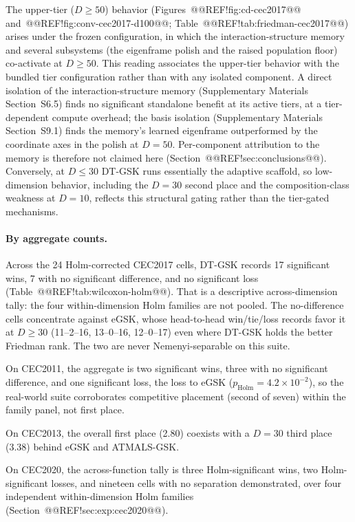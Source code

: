 \documentclass[10pt,a4paper]{article}
\newcommand{\dtgsk}{DT-GSK}
\newcommand{\atmals}{ATMALS-GSK}
\newcommand{\egsk}{eGSK}
\begin{document}
The upper-tier ($D \geq 50$) behavior (Figures~@@REF!fig:cd-cec2017@@
and~@@REF!fig:conv-cec2017-d100@@; Table~@@REF!tab:friedman-cec2017@@) arises under
the frozen configuration, in which the interaction-structure memory
and several subsystems (the eigenframe polish and the raised population
floor) co-activate at $D \geq 50$.
This reading associates the upper-tier behavior with the bundled
tier configuration rather than with any isolated component. A direct
isolation of the interaction-structure memory (Supplementary Materials
Section~S6.5) finds no significant standalone benefit at its active
tiers, at a tier-dependent compute overhead; the basis isolation
(Supplementary Materials Section~S9.1) finds the
memory's learned eigenframe outperformed by the coordinate axes in the polish
at $D = 50$. Per-component attribution to
the memory is therefore not claimed here (Section~@@REF!sec:conclusions@@).
Conversely, at $D \leq 30$ \dtgsk{} runs essentially the
adaptive scaffold, so low-dimension behavior, including the
$D = 30$ second place and the composition-class weakness at
$D = 10$, reflects this structural gating rather than the tier-gated
mechanisms.


\paragraph{By aggregate counts.}
Across the 24 Holm-corrected CEC2017 cells, \dtgsk{} records 17
significant wins, 7 with no significant difference, and no significant loss
(Table~@@REF!tab:wilcoxon-holm@@). That is a descriptive across-dimension tally:
the four within-dimension Holm families are not pooled. The
no-difference cells concentrate against
\egsk{}, whose head-to-head win/tie/loss records favor it at
$D \geq 30$ (11--2--16, 13--0--16, 12--0--17) even where \dtgsk{}
holds the better Friedman rank. The two are never
Nemenyi-separable on this suite.

On CEC2011, the aggregate is two significant wins, three with no
significant difference, and one significant loss, the loss to \egsk{}
($p_{\mathrm{Holm}} = 4.2 \times 10^{-2}$), so the real-world
suite corroborates competitive placement (second of seven) within the
family panel, not first place.

On CEC2013, the overall first place (2.80) coexists with a $D = 30$
third place (3.38) behind \egsk{} and \atmals{}.

On CEC2020, the across-function tally is three Holm-significant wins,
two Holm-significant losses, and nineteen cells with no separation
demonstrated, over four independent within-dimension Holm families
(Section~@@REF!sec:exp:cec2020@@).
\end{document}
